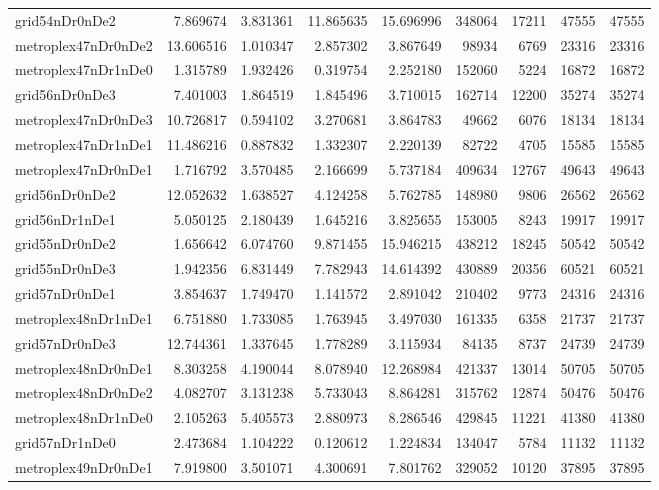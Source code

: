 \begin{longtable}{|l|r|r|r|r|r|r|r|r|}
grid54nDr0nDe2 & 7.869674 & 3.831361 & 11.865635 & 15.696996 & 348064 & 17211 & 47555 & 47555 \\
metroplex47nDr0nDe2 & 13.606516 & 1.010347 & 2.857302 & 3.867649 & 98934 & 6769 & 23316 & 23316 \\
metroplex47nDr1nDe0 & 1.315789 & 1.932426 & 0.319754 & 2.252180 & 152060 & 5224 & 16872 & 16872 \\
grid56nDr0nDe3 & 7.401003 & 1.864519 & 1.845496 & 3.710015 & 162714 & 12200 & 35274 & 35274 \\
metroplex47nDr0nDe3 & 10.726817 & 0.594102 & 3.270681 & 3.864783 & 49662 & 6076 & 18134 & 18134 \\
metroplex47nDr1nDe1 & 11.486216 & 0.887832 & 1.332307 & 2.220139 & 82722 & 4705 & 15585 & 15585 \\
metroplex47nDr0nDe1 & 1.716792 & 3.570485 & 2.166699 & 5.737184 & 409634 & 12767 & 49643 & 49643 \\
grid56nDr0nDe2 & 12.052632 & 1.638527 & 4.124258 & 5.762785 & 148980 & 9806 & 26562 & 26562 \\
grid56nDr1nDe1 & 5.050125 & 2.180439 & 1.645216 & 3.825655 & 153005 & 8243 & 19917 & 19917 \\
grid55nDr0nDe2 & 1.656642 & 6.074760 & 9.871455 & 15.946215 & 438212 & 18245 & 50542 & 50542 \\
grid55nDr0nDe3 & 1.942356 & 6.831449 & 7.782943 & 14.614392 & 430889 & 20356 & 60521 & 60521 \\
grid57nDr0nDe1 & 3.854637 & 1.749470 & 1.141572 & 2.891042 & 210402 & 9773 & 24316 & 24316 \\
metroplex48nDr1nDe1 & 6.751880 & 1.733085 & 1.763945 & 3.497030 & 161335 & 6358 & 21737 & 21737 \\
grid57nDr0nDe3 & 12.744361 & 1.337645 & 1.778289 & 3.115934 & 84135 & 8737 & 24739 & 24739 \\
metroplex48nDr0nDe1 & 8.303258 & 4.190044 & 8.078940 & 12.268984 & 421337 & 13014 & 50705 & 50705 \\
metroplex48nDr0nDe2 & 4.082707 & 3.131238 & 5.733043 & 8.864281 & 315762 & 12874 & 50476 & 50476 \\
metroplex48nDr1nDe0 & 2.105263 & 5.405573 & 2.880973 & 8.286546 & 429845 & 11221 & 41380 & 41380 \\
grid57nDr1nDe0 & 2.473684 & 1.104222 & 0.120612 & 1.224834 & 134047 & 5784 & 11132 & 11132 \\
metroplex49nDr0nDe1 & 7.919800 & 3.501071 & 4.300691 & 7.801762 & 329052 & 10120 & 37895 & 37895 \\

\end{longtable}

